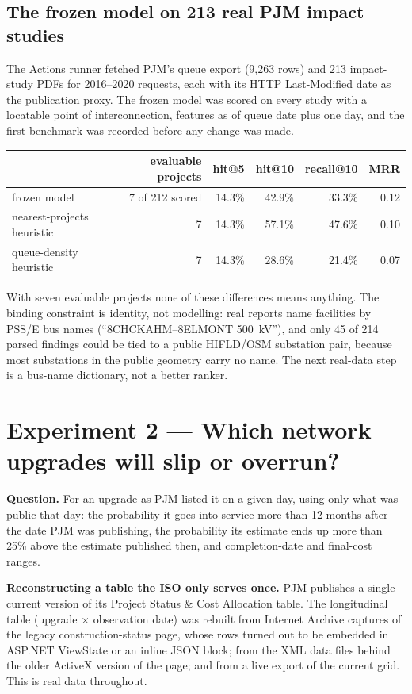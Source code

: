 \documentclass[11pt,a4paper]{article}
\begin{document}
\subsection*{The frozen model on 213 real PJM impact studies}

The Actions runner fetched PJM's queue export (9{,}263 rows) and 213 impact-study PDFs for 2016--2020 requests, each
with its HTTP Last-Modified date as the publication proxy. The frozen model was scored on every study with a locatable
point of interconnection, features as of queue date plus one day, and the first benchmark was recorded before any
change was made.

\begin{center}
\small
\begin{tabular}{lrrrrr}
\toprule
& evaluable projects & hit@5 & hit@10 & recall@10 & MRR \\
\midrule
frozen model & 7 of 212 scored & 14.3\% & 42.9\% & 33.3\% & 0.12 \\
nearest-projects heuristic & 7 & 14.3\% & 57.1\% & 47.6\% & 0.10 \\
queue-density heuristic & 7 & 14.3\% & 28.6\% & 21.4\% & 0.07 \\
\bottomrule
\end{tabular}
\end{center}

With seven evaluable projects none of these differences means anything. The binding constraint is identity, not
modelling: real reports name facilities by PSS/E bus names (``8CHCKAHM--8ELMONT 500~kV''), and only 45 of 214 parsed
findings could be tied to a public HIFLD/OSM substation pair, because most substations in the public geometry carry no
name. The next real-data step is a bus-name dictionary, not a better ranker.

\vspace{4pt}
\section*{Experiment 2 --- Which network upgrades will slip or overrun?}

\textbf{Question.} For an upgrade as PJM listed it on a given day, using only what was public that day: the probability
it goes into service more than 12 months after the date PJM was publishing, the probability its estimate ends up more
than 25\% above the estimate published then, and completion-date and final-cost ranges.

\textbf{Reconstructing a table the ISO only serves once.} PJM publishes a single current version of its Project Status \&
Cost Allocation table. The longitudinal table (upgrade $\times$ observation date) was rebuilt from Internet Archive
captures of the legacy construction-status page, whose rows turned out to be embedded in ASP.NET ViewState or an inline
JSON block; from the XML data files behind the older ActiveX version of the page; and from a live export of the current
grid. This is real data throughout.
\end{document}
